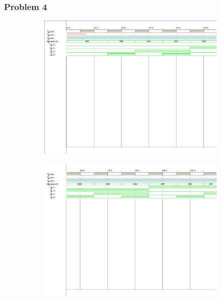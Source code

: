 \documentclass{lab_sheet}
\begin{document}
    \subsubsection*{Problem 4}
    \begin{figure}[H]
        \centering
        \begin{subfigure}{\linewidth}
            \includegraphics[width=.95\linewidth, frame]{../Figures/4-1.pdf}
        \caption{}
        \label{fig:obs4-1}
        \end{subfigure}
        \begin{subfigure}{\linewidth}
            \includegraphics[width=.95\linewidth, frame]{../Figures/4-2.pdf}
        \caption{}
        \label{fig:obs4-2}
        \end{subfigure}

\end{figure}
\end{document}
